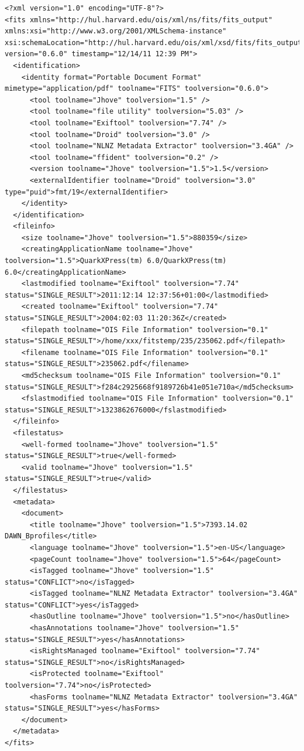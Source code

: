\vspace{-1em}
\lstset{
language=XML,
basicstyle=\tiny\ttfamily,
label=lst:fits_example,
caption=An example FITS output file}
\begin{lstlisting}
<?xml version="1.0" encoding="UTF-8"?>
<fits xmlns="http://hul.harvard.edu/ois/xml/ns/fits/fits_output" xmlns:xsi="http://www.w3.org/2001/XMLSchema-instance" xsi:schemaLocation="http://hul.harvard.edu/ois/xml/xsd/fits/fits_output.xsd" version="0.6.0" timestamp="12/14/11 12:39 PM">
  <identification>
    <identity format="Portable Document Format" mimetype="application/pdf" toolname="FITS" toolversion="0.6.0">
      <tool toolname="Jhove" toolversion="1.5" />
      <tool toolname="file utility" toolversion="5.03" />
      <tool toolname="Exiftool" toolversion="7.74" />
      <tool toolname="Droid" toolversion="3.0" />
      <tool toolname="NLNZ Metadata Extractor" toolversion="3.4GA" />
      <tool toolname="ffident" toolversion="0.2" />
      <version toolname="Jhove" toolversion="1.5">1.5</version>
      <externalIdentifier toolname="Droid" toolversion="3.0" type="puid">fmt/19</externalIdentifier>
    </identity>
  </identification>
  <fileinfo>
    <size toolname="Jhove" toolversion="1.5">880359</size>
    <creatingApplicationName toolname="Jhove" toolversion="1.5">QuarkXPress(tm) 6.0/QuarkXPress(tm) 6.0</creatingApplicationName>
    <lastmodified toolname="Exiftool" toolversion="7.74" status="SINGLE_RESULT">2011:12:14 12:37:56+01:00</lastmodified>
    <created toolname="Exiftool" toolversion="7.74" status="SINGLE_RESULT">2004:02:03 11:20:36Z</created>
    <filepath toolname="OIS File Information" toolversion="0.1" status="SINGLE_RESULT">/home/xxx/fitstemp/235/235062.pdf</filepath>
    <filename toolname="OIS File Information" toolversion="0.1" status="SINGLE_RESULT">235062.pdf</filename>
    <md5checksum toolname="OIS File Information" toolversion="0.1" status="SINGLE_RESULT">f284c2925668f9189726b41e051e710a</md5checksum>
    <fslastmodified toolname="OIS File Information" toolversion="0.1" status="SINGLE_RESULT">1323862676000</fslastmodified>
  </fileinfo>
  <filestatus>
    <well-formed toolname="Jhove" toolversion="1.5" status="SINGLE_RESULT">true</well-formed>
    <valid toolname="Jhove" toolversion="1.5" status="SINGLE_RESULT">true</valid>
  </filestatus>
  <metadata>
    <document>
      <title toolname="Jhove" toolversion="1.5">7393.14.02 DAWN_Bprofiles</title>
      <language toolname="Jhove" toolversion="1.5">en-US</language>
      <pageCount toolname="Jhove" toolversion="1.5">64</pageCount>
      <isTagged toolname="Jhove" toolversion="1.5" status="CONFLICT">no</isTagged>
      <isTagged toolname="NLNZ Metadata Extractor" toolversion="3.4GA" status="CONFLICT">yes</isTagged>
      <hasOutline toolname="Jhove" toolversion="1.5">no</hasOutline>
      <hasAnnotations toolname="Jhove" toolversion="1.5" status="SINGLE_RESULT">yes</hasAnnotations>
      <isRightsManaged toolname="Exiftool" toolversion="7.74" status="SINGLE_RESULT">no</isRightsManaged>
      <isProtected toolname="Exiftool" toolversion="7.74">no</isProtected>
      <hasForms toolname="NLNZ Metadata Extractor" toolversion="3.4GA" status="SINGLE_RESULT">yes</hasForms>
    </document>
  </metadata>
</fits>
\end{lstlisting}

